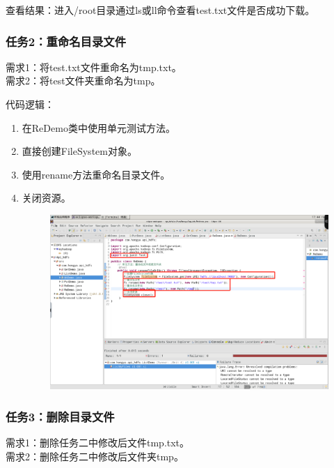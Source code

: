 \documentclass {article}
\begin{document}
				查看结果：进入/root目录通过ls或ll命令查看test.txt文件是否成功下载。
				
			\subsubsection{任务2：重命名目录文件}
				需求1：将test.txt文件重命名为tmp.txt。\\
				需求2：将test文件夹重命名为tmp。
				
				代码逻辑：
				\begin{enumerate}
					\item 在ReDemo类中使用单元测试方法。
					\item 直接创建FileSystem对象。
					\item 使用rename方法重命名目录文件。
					\item 关闭资源。
					\begin{figure}[H]
						\centering
						\includegraphics[width=4.5in]{figures/fig24.png}
					\end{figure}
				\end{enumerate}
			
			\subsubsection{任务3：删除目录文件}
				需求1：删除任务二中修改后文件tmp.txt。\\
				需求2：删除任务二中修改后文件夹tmp。
				
\end{document}
